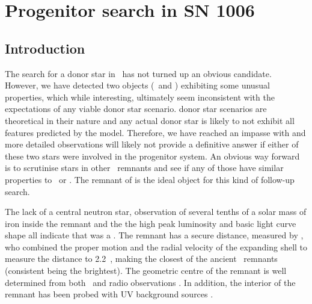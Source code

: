 \chapter{Progenitor search in SN 1006}
\label{chap:sn1006}


\section{Introduction}

The search for a donor star in \ has not turned up an obvious candidate. However, we have detected two objects (\starb\ and \starg) exhibiting some unusual properties, which while interesting, ultimately seem inconsistent with the expectations of any viable donor star scenario. \Gls{donor} star scenarios are theoretical in their nature and any actual donor star is likely to not exhibit all features predicted by the model. Therefore, we have reached an impasse with  and more detailed observations will likely not provide a definitive answer if either of these two stars were involved in the progenitor system. An obvious way forward is to scrutinise stars in other \snia\ remnants and see if any of those have similar properties to \starb\ or \starg. The remnant of  is the ideal object for this kind of follow-up search. 

The lack of a central neutron star, observation of several tenths of a solar mass of iron inside the remnant \citep{1997ApJ...481..838H} and the the high peak luminosity and basic light curve shape \citep[visible for several years][]{1965AJ.....70..748G} all indicate that  was a \snia. The remnant has a secure distance, measured by \citet{2003ApJ...585..324W}, who combined the proper motion and the radial velocity of the expanding shell to measure the distance to 2.2~\kpc, making  the closest of the ancient \snia\ remnants (consistent  being the brightest).   The geometric centre of the remnant is well determined from both \xray\ and radio observations \citep{2003ApJ...585..324W}. In addition, the interior of the remnant has been probed with UV background sources \citep{2005ApJ...624..189W}. 

